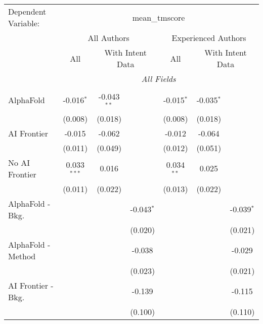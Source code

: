 \begingroup
\centering
\begin{tabular}{lcccccc}
   \tabularnewline \midrule \midrule
   Dependent Variable: & \multicolumn{6}{c}{mean\_tmscore}\\
 & \multicolumn{3}{c}{All Authors} & \multicolumn{3}{c}{Experienced Authors} \\
\cmidrule(lr){2-4} \cmidrule(lr){5-7}
 & \multicolumn{1}{c}{All} & \multicolumn{2}{c}{With Intent Data} & \multicolumn{1}{c}{All} & \multicolumn{2}{c}{With Intent Data} \\
\cmidrule(lr){2-2} \cmidrule(lr){3-4} \cmidrule(lr){5-5} \cmidrule(lr){6-7}
 & \multicolumn{6}{c}{\textit{All Fields}} \\ \\
   AlphaFold               & -0.016$^{*}$  & -0.043$^{**}$ &              & -0.015$^{*}$ & -0.035$^{*}$ &   \\   
                           & (0.008)       & (0.018)       &              & (0.008)      & (0.018)      &   \\   
   AI Frontier             & -0.015        & -0.062        &              & -0.012       & -0.064       &   \\   
                           & (0.011)       & (0.049)       &              & (0.012)      & (0.051)      &   \\   
   No AI Frontier          & 0.033$^{***}$ & 0.016         &              & 0.034$^{**}$ & 0.025        &   \\   
                           & (0.011)       & (0.022)       &              & (0.013)      & (0.022)      &   \\   
   AlphaFold - Bkg.        &               &               & -0.043$^{*}$ &              &              & -0.039$^{*}$\\   
                           &               &               & (0.020)      &              &              & (0.021)\\   
   AlphaFold - Method      &               &               & -0.038       &              &              & -0.029\\   
                           &               &               & (0.023)      &              &              & (0.021)\\   
   AI Frontier - Bkg.      &               &               & -0.139       &              &              & -0.115\\   
                           &               &               & (0.100)      &              &              & (0.110)\\   

\end{tabular}
